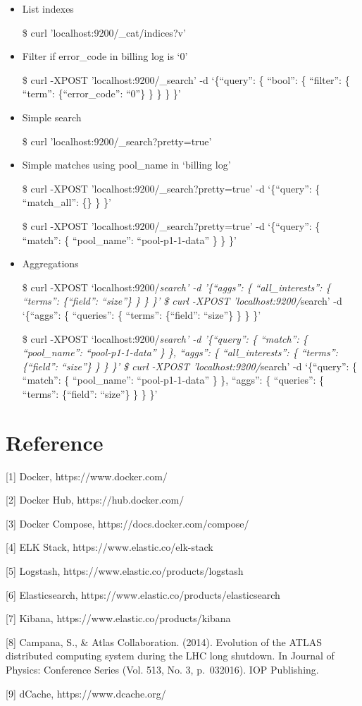 \documentclass[]{article}
\begin{document}
\begin{itemize}
\item
  List indexes

  \$ curl 'localhost:9200/\_cat/indices?v'
\item
  Filter if error\_code in billing log is `0'

  \$ curl -XPOST 'localhost:9200/\_search' -d `\{``query'': \{ ``bool'':
  \{ ``filter'': \{ ``term'': \{``error\_code'': ``0''\} \} \} \} \}'
\item
  Simple search

  \$ curl 'localhost:9200/\_search?pretty=true'
\item
  Simple matches using pool\_name in `billing log'

  \$ curl -XPOST 'localhost:9200/\_search?pretty=true' -d `\{``query'':
  \{ ``match\_all'': \{\} \} \}'

  \$ curl -XPOST 'localhost:9200/\_search?pretty=true' -d `\{``query'':
  \{ ``match'': \{ ``pool\_name'': ``pool-p1-1-data'' \} \} \}'
\item
  Aggregations

  \$ curl -XPOST `localhost:9200/\emph{search' -d '\{``aggs'': \{
  ``all\_interests'': \{ ``terms'': \{``field'': ``size''\} \} \} \}' \$
  curl -XPOST 'localhost:9200/}search' -d `\{``aggs'': \{ ``queries'':
  \{ ``terms'': \{``field'': ``size''\} \} \} \}'

  \$ curl -XPOST `localhost:9200/\emph{search' -d '\{``query'': \{
  ``match'': \{ ``pool\_name'': ``pool-p1-1-data'' \} \}, ``aggs'': \{
  ``all\_interests'': \{ ``terms'': \{``field'': ``size''\} \} \} \}' \$
  curl -XPOST 'localhost:9200/}search' -d `\{``query'': \{ ``match'': \{
  ``pool\_name'': ``pool-p1-1-data'' \} \}, ``aggs'': \{ ``queries'': \{
  ``terms'': \{``field'': ``size''\} \} \} \}'
\end{itemize}

\section{Reference}\label{reference}

{[}1{]} Docker, https://www.docker.com/

{[}2{]} Docker Hub, https://hub.docker.com/

{[}3{]} Docker Compose, https://docs.docker.com/compose/

{[}4{]} ELK Stack, https://www.elastic.co/elk-stack

{[}5{]} Logstash, https://www.elastic.co/products/logstash

{[}6{]} Elasticsearch, https://www.elastic.co/products/elasticsearch

{[}7{]} Kibana, https://www.elastic.co/products/kibana

{[}8{]} Campana, S., \& Atlas Collaboration. (2014). Evolution of the
ATLAS distributed computing system during the LHC long shutdown. In
Journal of Physics: Conference Series (Vol. 513, No. 3, p.~032016). IOP
Publishing.

{[}9{]} dCache, https://www.dcache.org/
\end{document}
